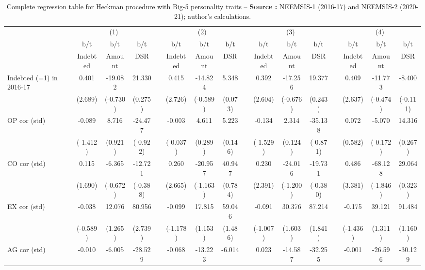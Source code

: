 {\tiny\tabcolsep=0pt
    \begin{longtable}{@{\extracolsep{\fill}}lccccccccccccccc}
	\caption{Complete regression table for Heckman procedure with Big-5 personality traits --  \textbf{Source :} NEEMSIS-1 (2016-17) and NEEMSIS-2 (2020-21); author's calculations.} \\
    \toprule
      & \multicolumn{3}{c}{(1)} &   & \multicolumn{3}{c}{(2)} &   & \multicolumn{3}{c}{(3)} &   & \multicolumn{3}{c}{(4)} \\
\cmidrule{2-4}\cmidrule{6-8}\cmidrule{10-12}\cmidrule{14-16}      & b/t & b/t & b/t &   & b/t & b/t & b/t &   & b/t & b/t & b/t &   & b/t & b/t & b/t \\
      & Indebted & Amount & DSR &   & Indebted & Amount & DSR &   & Indebted & Amount & DSR &   & Indebted & Amount & DSR \\
    \midrule
    Indebted (=1) in 2016-17 & 0.401 & -19.082 & 21.330 &       & 0.415 & -14.824 & 5.348 &       & 0.392 & -17.256 & 19.377 &       & 0.409 & -11.773 & -8.400 \\
          & (2.689) & (-0.730) & (0.275) &       & (2.726) & (-0.589) & (0.073) &       & (2.604) & (-0.676) & (0.243) &       & (2.637) & (-0.474) & (-0.111) \\
    OP cor (std) & -0.089 & 8.716 & -24.477 &       & -0.003 & 4.611 & 5.223 &       & -0.134 & 2.314 & -35.138 &       & 0.072 & -5.070 & 14.316 \\
          & (-1.412) & (0.921) & (-0.922) &       & (-0.037) & (0.289) & (0.146) &       & (-1.529) & (0.124) & (-0.871) &       & (0.582) & (-0.172) & (0.267) \\
    CO cor (std) & 0.115 & -6.365 & -12.721 &       & 0.260 & -20.957 & 40.947 &       & 0.230 & -24.016 & -19.731 &       & 0.486 & -68.128 & 29.064 \\
          & (1.690) & (-0.672) & (-0.388) &       & (2.665) & (-1.163) & (0.784) &       & (2.391) & (-1.200) & (-0.380) &       & (3.381) & (-1.846) & (0.323) \\
    EX cor (std) & -0.038 & 12.076 & 80.956 &       & -0.099 & 17.815 & 59.046 &       & -0.091 & 30.376 & 87.214 &       & -0.175 & 39.121 & 91.484 \\
          & (-0.589) & (1.265) & (2.739) &       & (-1.178) & (1.153) & (1.486) &       & (-1.007) & (1.603) & (1.841) &       & (-1.436) & (1.311) & (1.160) \\
    AG cor (std) & -0.010 & -6.005 & -28.529 &       & -0.068 & -13.223 & -6.014 &       & 0.023 & -14.587 & -32.255 &       & -0.001 & -26.596 & -30.129 \\

\end{longtable}}
